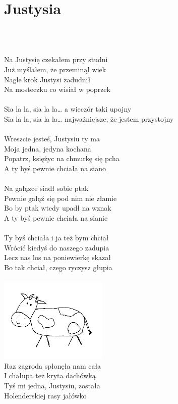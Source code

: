 \documentclass[a5paper, 10pt]{book}
\begin{document}
\newpage
\section{Justysia}\textcolor{lightgray}{\textit{}}\\~\\
\begin{minipage}[t]{0.75\textwidth}
Na Justysię czekałem przy studni\\
Już myślałem, że przeminął wiek\\
Nagle krok Justysi zadudnił\\
Na mosteczku co wisiał w poprzek\\
\\
\hspace*{5mm}Sia la la, sia la la… a wieczór taki upojny\\
\hspace*{5mm}Sia la la, sia la la… najważniejsze, że jestem przystojny\\
\\
Wreszcie jesteś, Justysiu ty ma\\
Moja jedna, jedyna kochana\\
Popatrz, księżyc na chmurkę się pcha\\
A ty byś pewnie chciała na siano\\
\\
Na gałązce siadł sobie ptak\\
Pewnie gałąź się pod nim nie złamie\\
Bo by ptak wtedy upadł na wznak\\
A ty byś pewnie chciała na sianie\\
\\
Ty byś chciała i ja też bym chciał\\
Wrócić kiedyś do naszego zadupia\\
Lecz nas los na poniewierkę skazał\\
Bo tak chciał, czego ryczysz głupia\\
\\
\includegraphics[height=4cm, angle=10, right]{images/justysia.png}\vspace*{-4.9cm}\\
Raz zagroda spłonęła nam cała\\
I chałupa też kryta dachówką\\
Tyś mi jedna, Justysiu, została\\
Holenderskiej rasy jałówko\\
\\
\end{minipage}
\end{document}
